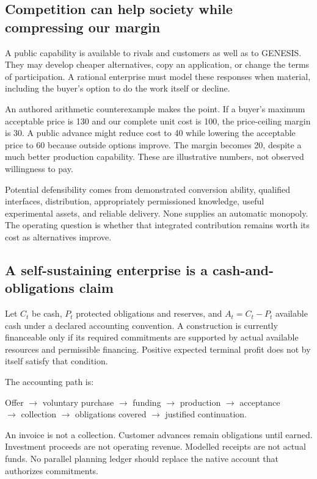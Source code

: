 \documentclass[11pt,letterpaper]{article}
\theoremstyle{remark}\newtheorem{remark}{Remark}[section]
\begin{document}
\subsection{Competition can help society while compressing our margin}
A public capability is available to rivals and customers as well as to GENESIS. They may develop cheaper alternatives, copy an application, or change the terms of participation. A rational enterprise must model these responses when material, including the buyer's option to do the work itself or decline.

An authored arithmetic counterexample makes the point. If a buyer's maximum acceptable price is 130 and our complete unit cost is 100, the price-ceiling margin is 30. A public advance might reduce cost to 40 while lowering the acceptable price to 60 because outside options improve. The margin becomes 20, despite a much better production capability. These are illustrative numbers, not observed willingness to pay.

Potential defensibility comes from demonstrated conversion ability, qualified interfaces, distribution, appropriately permissioned knowledge, useful experimental assets, and reliable delivery. None supplies an automatic monopoly. The operating question is whether that integrated contribution remains worth its cost as alternatives improve.

\subsection{A self-sustaining enterprise is a cash-and-obligations claim}
Let $C_t$ be cash, $P_t$ protected obligations and reserves, and $A_t=C_t-P_t$ available cash under a declared accounting convention. A construction is currently financeable only if its required commitments are supported by actual available resources and permissible financing. Positive expected terminal profit does not by itself satisfy that condition.

The accounting path is:
\begin{center}
\small
Offer $\rightarrow$ voluntary purchase $\rightarrow$ funding $\rightarrow$ production $\rightarrow$ acceptance\\
$\rightarrow$ collection $\rightarrow$ obligations covered $\rightarrow$ justified continuation.
\end{center}
An invoice is not a collection. Customer advances remain obligations until earned. Investment proceeds are not operating revenue. Modelled receipts are not actual funds. No parallel planning ledger should replace the native account that authorizes commitments.
\end{document}
